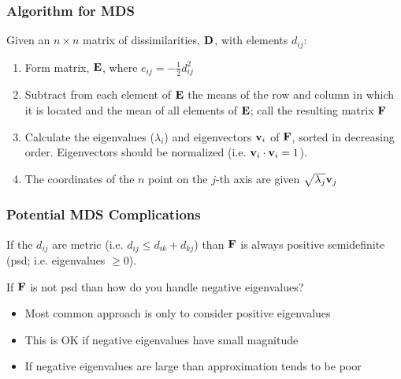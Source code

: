 \documentclass{beamer}
\begin{document}
\begin{frame}
\frametitle{Algorithm for MDS}

Given an $n \times n$ matrix of dissimilarities, $\mathbf{D}$, with elements $d_{ij}$:

\begin{enumerate}
\item Form matrix, $\mathbf{E}$, where $e_{ij} = -\frac{1}{2} d_{ij}^2$

\item Subtract from each element of $\mathbf{E}$ the means of the row and column in which it is located and the mean of all elements of $\mathbf{E}$; call the resulting matrix $\mathbf{F}$

\item Calculate the eigenvalues ($\lambda_i$) and eigenvectors $\mathbf{v}_i$ of $\mathbf{F}$, sorted in decreasing order. Eigenvectors should be normalized (i.e. $\mathbf{v}_i \cdot \mathbf{v}_i = 1$).

\item The coordinates of the $n$ point on the $j$-th axis are given $\sqrt{\lambda_j}\mathbf{v}_j$

\end{enumerate}

\end{frame}

\begin{frame}
  \frametitle{Potential MDS Complications}

If the $d_{ij}$ are metric (i.e. $d_{ij} \leq d_{ik} + d_{kj}$) than $\mathbf{F}$ is always positive semidefinite (psd; i.e. eigenvalues $\geq 0$).

\medskip
If $\mathbf{F}$ is not psd than how do you handle negative eigenvalues?

\begin{itemize}

\item Most common approach is only to consider positive eigenvalues
\item This is OK if negative eigenvalues have small magnitude
\item If negative eigenvalues are large than approximation tends to be poor

\end{itemize}


\end{frame}
\end{document}
